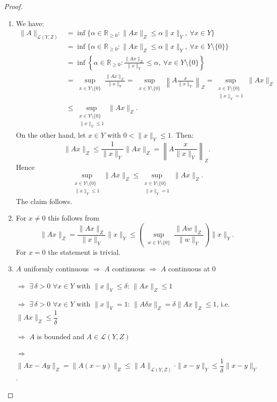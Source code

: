 \documentclass[12pt]{article}
\begin{document}
\begin{proof}
\begin{enumerate}
    \item We have:
    \begin{align*}
    \|A\|_{\mathcal L(Y,Z)}
    &=\inf\{\alpha\in\mathbb R_{\ge 0}:\|Ax\|_Z\le\alpha\|x\|_Y,\ \forall x\in Y\}\\
    &=\inf\{\alpha\in\mathbb R_{\ge 0}:\|Ax\|_Z\le\alpha\|x\|_Y,\ \forall x\in Y\setminus\{0\}\}\\
    &=\inf\left\{\alpha\in\mathbb R_{\ge 0}:\frac{\|Ax\|_Z}{\|x\|_Y}\le\alpha,\ \forall x\in Y\setminus\{0\}\right\}\\
    &=\sup_{\substack{x\in Y\setminus\{0\}}}\frac{\|Ax\|_Z}{\|x\|_Y}
    =\sup_{\substack{x\in Y\setminus\{0\}}}\left\|A\frac{x}{\|x\|_Y}\right\|_Z
    =\sup_{\substack{x\in Y\setminus\{0\}\\\|x\|_Y=1}}\|Ax\|_Z\\
    &\le\sup_{\substack{x\in Y\setminus\{0\}\\\|x\|_Y\le 1}}\|Ax\|_Z.
    \end{align*}
    On the other hand, let $x\in Y$ with $0<\|x\|_Y\le 1$. Then:
    \[
    \|Ax\|_Z
    \le\frac{1}{\|x\|_Y}\|Ax\|_Z
    =\left\|A\frac{x}{\|x\|_Y}\right\|_Z.
    \]
    Hence
    \[
    \sup_{\substack{x\in Y\setminus\{0\}\\\|x\|_Y\le 1}}\|Ax\|_Z
    \le\sup_{\substack{x\in Y\setminus\{0\}\\\|x\|_Y=1}}\|Ax\|_Z.
    \]
    The claim follows.

    \item For $x\neq 0$ this follows from
    \[
    \|Ax\|_Z
    =\frac{\|Ax\|_Z}{\|x\|_Y}\|x\|_Y
    \le\left(\sup_{\substack{w\in Y\setminus\{0\}}}\frac{\|Aw\|_Z}{\|w\|_Y}\right)\|x\|_Y.
    \]
    For $x=0$ the statement is trivial.

    \item $A$ uniformly continuous $\Longrightarrow$ $A$ continuous $\Longrightarrow$ $A$ continuous at $0$

    $\Longrightarrow$ $\exists\,\delta>0$ $\forall x\in Y$ with $\|x\|_Y\le\delta$: $\|Ax\|_Z\le 1$

    $\Longrightarrow$ $\exists\,\delta>0$ $\forall x\in Y$ with $\|x\|_Y=1$:
    $\|A\delta x\|_Z=\delta\|Ax\|_Z\le 1$, i.e.\ $\|Ax\|_Z\le\dfrac{1}{\delta}$

    $\Longrightarrow$ $A$ is bounded and $A\in\mathcal L(Y,Z)$

    $\Longrightarrow$ $\|Ax-Ay\|_Z=\|A(x-y)\|_Z\le\|A\|_{\mathcal L(Y,Z)}\cdot\|x-y\|_Y
    \le\dfrac{1}{\delta}\|x-y\|_Y$.
\end{enumerate}
\end{proof}
\end{document}
